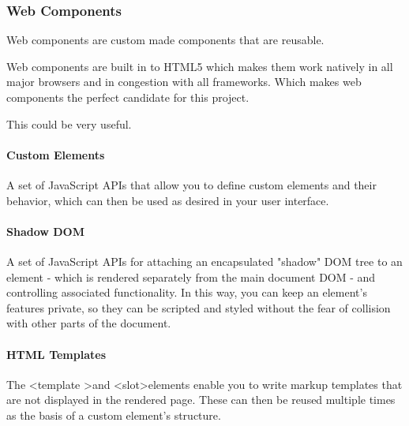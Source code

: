 




\subsubsection{Web Components}%
\label{sub:Web Components}
Web components are custom made components that are reusable.

Web components are built in to HTML5 which makes them work natively in all major browsers and in congestion with all frameworks. Which makes web components the perfect candidate for this project. 

This \cite{WebComponentsMDN} could be very useful.

\paragraph{Custom Elements}
\label{ssub:Custom Elements}

A set of JavaScript APIs that allow you to define custom elements and their behavior, which can then be used as desired in your user interface.


\paragraph{Shadow DOM}%
\label{ssub:Shadow DOM}
A set of JavaScript APIs for attaching an encapsulated "shadow" DOM tree to an element - which is rendered separately from the main document DOM - and controlling associated functionality. In this way, you can keep an element's features private, so they can be scripted and styled without the fear of collision with other parts of the document.

\paragraph{HTML Templates}%
\label{ssub:HMTL Templates}
The \textless template \textgreater and \textless slot\textgreater elements enable you to write markup templates that are not displayed in the rendered page. These can then be reused multiple times as the basis of a custom element's structure.

